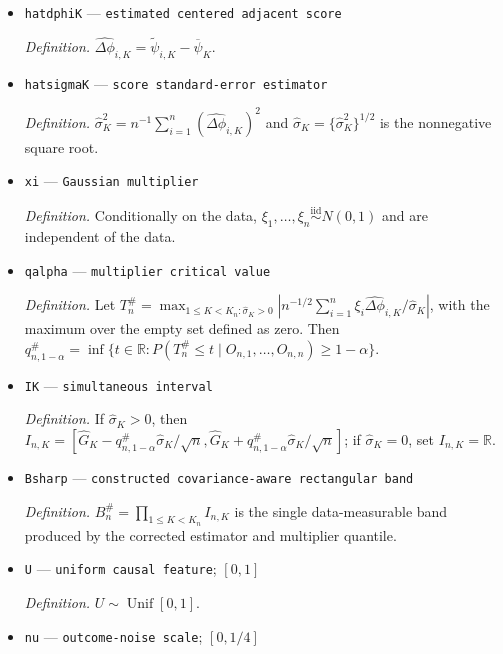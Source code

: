 \documentclass{article}
\begin{document}
\begin{itemize}
  \par\smallskip\noindent\emph{Definition.} \(\overline\psi_K=n^{-1}\sum_{i=1}^n\widetilde\psi_{i,K}\).
  \item \texttt{hatdphiK} --- \texttt{estimated centered adjacent score}
  \par\smallskip\noindent\emph{Definition.} \(\widehat{\Delta\phi}_{i,K}=\widetilde\psi_{i,K}-\overline\psi_K\).
  \item \texttt{hatsigmaK} --- \texttt{score standard-\allowbreak{}error estimator}
  \par\smallskip\noindent\emph{Definition.} \(\widehat\sigma_K^2=n^{-1}\sum_{i=1}^n(\widehat{\Delta\phi}_{i,K})^2\) and \(\widehat\sigma_K=\{\widehat\sigma_K^2\}^{1/2}\) is the nonnegative square root.
  \item \texttt{xi} --- \texttt{Gaussian multiplier}
  \par\smallskip\noindent\emph{Definition.} Conditionally on the data, \(\xi_1,\ldots,\xi_n\stackrel{\mathrm{iid}}{\sim}N(0,1)\) and are independent of the data.
  \item \texttt{qalpha} --- \texttt{multiplier critical value}
  \par\smallskip\noindent\emph{Definition.} Let \(T_n^{\#}=\max_{1\le K<K_n:\widehat\sigma_K>0}|n^{-1/2}\sum_{i=1}^n\xi_i\widehat{\Delta\phi}_{i,K}/\widehat\sigma_K|\), with the maximum over the empty set defined as zero. Then \(q_{n,1-\alpha}^{\#}=\inf\{t\in\mathbb R:P(T_n^{\#}\le t\mid O_{n,1},\ldots,O_{n,n})\ge1-\alpha\}\).
  \item \texttt{IK} --- \texttt{simultaneous interval}
  \par\smallskip\noindent\emph{Definition.} If \(\widehat\sigma_K>0\), then \(I_{n,K}=[\widehat G_K-q_{n,1-\alpha}^{\#}\widehat\sigma_K/\sqrt n,\widehat G_K+q_{n,1-\alpha}^{\#}\widehat\sigma_K/\sqrt n]\); if \(\widehat\sigma_K=0\), set \(I_{n,K}=\mathbb R\).
  \item \texttt{Bsharp} --- \texttt{constructed covariance-\allowbreak{}aware rectangular band}
  \par\smallskip\noindent\emph{Definition.} \(B_n^{\#}=\prod_{1\le K<K_n}I_{n,K}\) is the single data-measurable band produced by the corrected estimator and multiplier quantile.
  \item \texttt{U} --- \texttt{uniform causal feature}; \([0,1]\)
  \par\smallskip\noindent\emph{Definition.} \(U\sim\operatorname{Unif}[0,1]\).
  \item \texttt{nu} --- \texttt{outcome-\allowbreak{}noise scale}; \([0,1/4]\)

\end{itemize}
\end{document}
